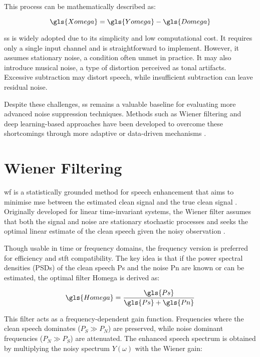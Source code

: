 This process can be mathematically described as:

\begin{equation}
    \gls{Xomega} = \gls{Yomega} - \gls{Domega}
\end{equation}

\gls{ss} is widely adopted due to its simplicity and low computational cost. It requires only a single input channel and is straightforward to implement. However, it assumes stationary noise, a condition often unmet in practice. It may also introduce musical noise, a type of distortion perceived as tonal artifacts. Excessive subtraction may distort speech, while insufficient subtraction can leave residual noise.

Despite these challenges, \gls{ss} remains a valuable baseline for evaluating more advanced noise suppression techniques. Methods such as Wiener filtering and deep learning-based approaches have been developed to overcome these shortcomings through more adaptive or data-driven mechanisms \cite{loizou2013speech}.


\section{Wiener Filtering}
\label{sec:wiener_filtering}

\gls{wf} is a statistically grounded method for speech enhancement that aims to minimise \gls{mse} between the estimated clean signal and the true clean signal \cite{loizou2013speech}. Originally developed for linear time-invariant systems, the Wiener filter assumes that both the signal and noise are stationary stochastic processes and seeks the optimal linear estimate of the clean speech given the noisy observation \cite{dubey2016evaluation}.

Though usable in time or frequency domains, the frequency version is preferred for efficiency and \gls{stft} compatibility. The key idea is that if the power spectral densities (PSDs) of the clean speech \gls{Ps} and the noise \gls{Pn} are known or can be estimated, the optimal filter \gls{Homega} is derived as:

\begin{equation}
    \gls{Homega} = \frac{\gls{Ps}}{\gls{Ps} + \gls{Pn}}
\end{equation}

This filter acts as a frequency-dependent gain function. Frequencies where the clean speech dominates (\(P_S \gg P_N\)) are preserved, while noise dominant frequencies (\(P_N \gg P_S\)) are attenuated. The enhanced speech spectrum is obtained by multiplying the noisy spectrum \(Y(\omega)\) with the Wiener gain:

